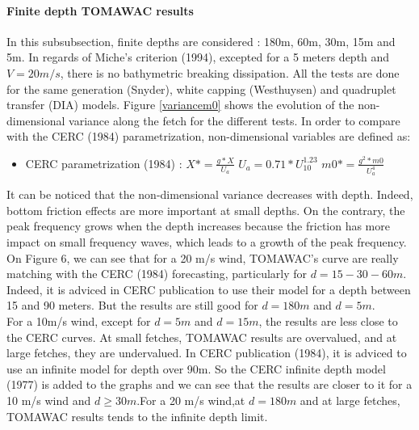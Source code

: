 \paragraph{Finite depth TOMAWAC results}
In this subsubsection, finite depths are considered : 180m, 60m, 30m, 15m and 5m. In regards of Miche's criterion (1994), excepted for a 5 meters depth and $V = 20m/s$, there is no bathymetric breaking dissipation. All the tests are done for the same generation (Snyder), white capping (Westhuysen) and quadruplet transfer (DIA) models. Figure \ref{variancem0} shows the evolution of the non-dimensional variance along the fetch for the different tests. In order to compare with the CERC (1984) parametrization, non-dimensional variables are defined as:\\
\begin{itemize}
\item CERC parametrization (1984) :
\subitem $X* = \frac{g*X}{U_a}$
\subitem $U_a = 0.71*U_{10}^{1.23}$
\subitem $m0* = \frac{g^2*m0}{U_a^4}$
\end{itemize}
It can be noticed that the non-dimensional variance decreases with depth. Indeed, bottom friction effects are more important at small depths. On the contrary, the peak frequency grows when the depth increases because the friction has more impact on small frequency waves, which leads to a growth of the peak frequency.\\
On Figure 6, we can see that for a 20 m/s wind, TOMAWAC's curve are really matching with the CERC (1984) forecasting, particularly for $d = 15 - 30 - 60 m$. Indeed, it is adviced in CERC publication to use their model for a depth between 15 and 90 meters. But the results are still good for $d = 180 m$ and $d = 5 m$.\\
For a 10m/s wind, except for $d = 5 m $ and $d = 15 m$, the results are less close to the CERC curves. At small fetches, TOMAWAC results are overvalued, and at large fetches, they are undervalued. In CERC publication (1984), it is adviced to use an infinite model for depth over 90m. So the CERC infinite depth model (1977) is added to the graphs and we can see that the results are closer to it for a 10 m/s wind and $d \geq 30m$.For a 20 m/s wind,at $d = 180m$ and at large fetches, TOMAWAC results tends to the infinite depth limit.

